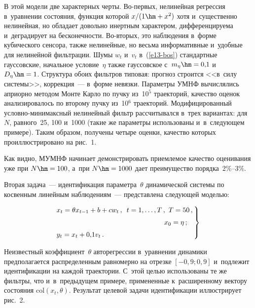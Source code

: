 \begin{multicols}{2}
    В этой модели две характерных черты. Во-пер\-вых, нелинейная регрессия 
    в~уравнении состояния, функция которой $x/(1\hm+x^2)$ хотя и~существенно 
нелинейная, но обладает довольно инертным характером, дифференцируема 
и~деградирует на бесконечности. Во-вто\-рых, это наблюдения в~форме 
кубического сенсора, также нелинейные, но весьма информативные и~удобные 
для нелинейной фильт\-ра\-ции. Шумы $w_t$ и~$v_t$ в~(\ref{e13-bos}) стандартные 
гауссовские, начальное условие~$\eta$ также гауссовское с~$m_\eta\hm= 
0{,}1$ и~$D_\eta\hm=1$. Структура обоих фильт\-ров типовая: прогноз строится 
<<в~силу сис\-те\-мы>>, коррекция~--- в~форме невязки. Параметры УМНФ 
вы\-чис\-ля\-лись априорно методом Мон\-те Кар\-ло по пучку из~10$^5$ 
траекторий, качество оценок анализировалось по второму пучку из~10$^6$ 
траекторий. Модифицированный услов\-но-ми\-ни\-макс\-ный нелинейный
фильтр рассчитывался в~трех вариантах: для~$N$, равного~25, 
100 и~1000 (такие же па\-ра\-мет\-ры использованы и~в~следующем примере). Таким 
образом, получены четыре оценки, качество которых проиллюстрировано на 
рис.~1.
    
    
     
    
    Как видно, МУМНФ начинает демонстрировать приемлемое качество 
оценивания уже при $N\hm=100$,  а~при $N\hm=1000$ дает преимущество 
порядка~2\%--3\%.
{

}
    
    Вторая задача~--- идентификация параметра~$\theta$ динамической 
системы по косвенным линейным наблюдениям~--- представлена следующей 
мо\-делью:
{

}
    \begin{equation}
    \left.
    \begin{array}{l}
    \hspace*{-3mm}x_t=\theta x_{t-1}+b+cw_t\,,\enskip t=1,\ldots , T\,,\ T=50\,,\\[6pt]
    \hspace*{52mm}x_0=\eta\,;\\[6pt]
        \hspace*{-3mm}y_t=x_t+0{,}1v_t\,.
    \end{array}\!\!
    \right\}\!\!
    \label{e14-bos}
    \end{equation}
    
    Неизвестный коэффициент~$\theta$ авторегрессии в~уравнении динамики 
предполагается распределенным равномерно на отрезке $[-0{,}9; 0{,}9]$ 
и~подлежит идентификации на каждой траектории. С~этой целью 
использованы те же фильтры, что и~в~предыду\-щем примере, примененные 
к~расширенному вектору состояния $\mathrm{col}\left (x_t,\theta\right)$. Результат целевой задачи 
идентификации иллюстрирует рис.~2.
{

}
\end{multicols}
